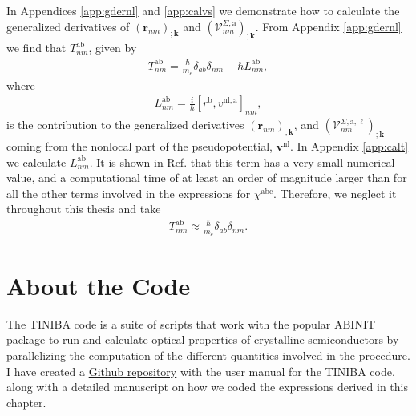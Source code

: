 In Appendices \ref{app:gdernl} and \ref{app:calvs} we demonstrate how to
calculate the generalized derivatives of
$\left(\mathbf{r}_{nm}\right)_{;\mathbf{k}}$ and
$\left(\mathcal{V}^{\Sigma,\mathrm{a}}_{nm}\right)_{;\mathbf{k}}$. From
Appendix \ref{app:gdernl} we find that
$T_{nm}^{\mathrm{ab}}$, given by
\begin{align}\label{tau.1}
T_{nm}^{\mathrm{ab}}
= \frac{\hbar}{m_{e}}\delta_{ab}\delta_{nm}
- \hbar L_{nm}^{\mathrm{ab}},
\end{align}  
where
\begin{align}\label{tau.2}
L_{nm}^{\mathrm{ab}}
= \frac{i}{\hbar}\left[r^{\mathrm{b}},v^{\mathrm{nl},\mathrm{a}}\right]_{nm},
\end{align}
is the contribution to the generalized derivatives
$\left(\mathbf{r}_{nm}\right)_{;\mathbf{k}}$, and
$\left(\mathcal{V}^{\Sigma,\mathrm{a},\ell}_{nm}\right)_{;\mathbf{k}}$ coming
from the nonlocal part of the pseudopotential, $\mathbf{v}^{\mathrm{nl}}$. In
Appendix \ref{app:calt} we calculate $L^{\mathrm{ab}}_{nm}$. It is shown in Ref.
\cite{valerie} that this term has a very small numerical value, and a
computational time of at least an order of magnitude larger than for all the
other terms involved in the expressions for $\chi^{\mathrm{abc}}$. Therefore, we
neglect it throughout this thesis and take
\begin{align}\label{tau.69}
T_{nm}^{\mathrm{ab}} \approx \frac{\hbar}{m_{e}}\delta_{ab}\delta_{nm}.
\end{align} 



\section{About the Code}

The TINIBA code is a suite of scripts that work with the popular ABINIT package
to run and calculate optical properties of crystalline semiconductors by
parallelizing the computation of the different quantities involved in the
procedure. I have created a
\href{https://github.com/roguephysicist/tiniba-manual}{Github repository}
with the user manual for the TINIBA code, along with a detailed manuscript on
how we coded the expressions derived in this chapter.



